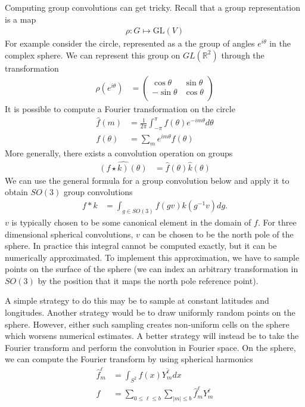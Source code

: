 \documentclass[book.tex]{subfiles}
\begin{document}
Computing group convolutions can get tricky. Recall that a group representation is a map 
\begin{align}
    \rho: G \mapsto \mathrm{GL}(V)
\end{align}
For example consider the circle, represented as a the group of angles $e^{i\theta}$ in the complex sphere. We can represent this group on $GL(\mathbb{R}^2)$ through the transformation
\begin{align}
    \rho(e^{i\theta}) &= \begin{pmatrix}
    \cos \theta & \sin \theta \\
    -\sin \theta & \cos \theta\\
    \end{pmatrix}
\end{align}
It is possible to compute a Fourier transformation on the circle
\begin{align}
    \hat{f}(m) &= \frac{1}{2\pi} \int_{-\pi}^{\pi}f(\theta) e^{-im\theta}d \theta \\
    f(\theta) &= \sum_{m} e^{im\theta} f(\theta)
\end{align}
More generally, there exists a convolution operation on groups
\begin{align}
    \widehat{(f\star k)(\theta)} &= \hat{f}(\theta)\hat{k}(\theta)
\end{align}
We can use the general formula for a group convolution below and apply it to obtain $SO(3)$ group convolutions
\begin{align}
    f*k &= \int_{g\in SO(3)}f(gv)k(g^{-1}v) dg. 
\end{align}
$v$ is typically chosen to be some canonical element in the domain of $f$. For three dimensional spherical convolutions, $v$ can be chosen to be the north pole of the sphere. In practice this integral cannot be computed exactly, but it can be numerically approximated. To implement this approximation, we have to sample points on the surface of the sphere (we can index an arbitrary transformation in $SO(3)$ by the position that it maps the north pole reference point).

A simple strategy to do this may be to sample at constant latitudes and longitudes. Another strategy would be to draw uniformly random points on the sphere. However, either such sampling creates non-uniform cells on the sphere which worsens numerical estimates. A better strategy will instead be to take the Fourier transform and perform the convolution in Fourier space. On the sphere, we can compute the Fourier transform by using spherical harmonics
\begin{align}
\hat{f}^\ell_m &= \int_{S^2} f(x) \overline{Y^\ell_m} dx \\
f &= \sum_{0 \leq \ell \leq b} \sum_{|m| \leq b} \hat{f}^{\ell}_m Y^\ell_m \\
\end{align}
\end{document}
